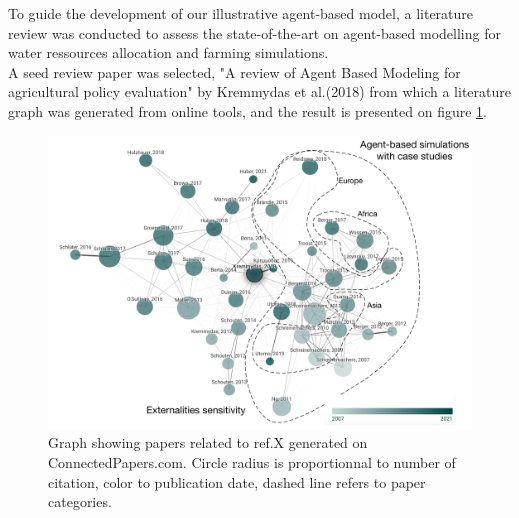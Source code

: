 \documentclass[a4paper,12pt]{article} %
\begin{document}
To guide the development of our illustrative agent-based model, a literature review was conducted to assess the state-of-the-art on agent-based modelling for water ressources allocation and farming simulations. \\
A seed review paper was selected, "A review of Agent Based Modeling for agricultural policy evaluation" by Kremmydas et al.(2018) from which a literature graph was generated from online tools, and the result is presented on figure \ref{fig:State_of_the_art}.


\begin{figure}[H]
	\includegraphics[width=\textwidth]{Figures/StateOfTheArt2.pdf}
	\centering
	\caption{Graph showing papers related to ref.X generated on ConnectedPapers.com. Circle radius is proportionnal to number of citation, color to publication date, dashed line refers to paper categories.}
	\label{fig:State_of_the_art}
\end{figure}
\end{document}
